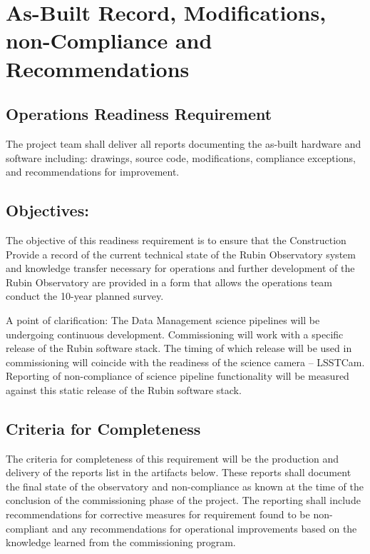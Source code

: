 \section{As-Built Record, Modifications, non-Compliance and Recommendations} \label{sec:recs}

\subsection{Operations Readiness Requirement}
The project team shall deliver all reports documenting the as-built hardware and software including: drawings, source code, modifications, compliance exceptions, and recommendations for improvement.

\subsection{Objectives:}

The objective of this readiness requirement is to ensure that the Construction Provide a record of the current technical state of the Rubin Observatory system and knowledge transfer necessary for operations and further development of the Rubin Observatory are provided in a form that allows the operations team conduct the 10-year planned survey.

A point of clarification: The Data Management science pipelines will be undergoing continuous development.  Commissioning will work with a specific release of the Rubin software stack.  The timing of which release will be used in commissioning will coincide with the readiness of the science camera -- LSSTCam.  Reporting of non-compliance of science pipeline functionality will be measured against this static release of the Rubin software stack.

\subsection{Criteria for Completeness}

The criteria for completeness of this requirement will be the production and delivery of the reports list in the artifacts below.  These reports shall document the final state of the observatory and non-compliance as known at the time of the conclusion of the commissioning phase of the project.  The reporting shall include recommendations for corrective measures for requirement found to be non-compliant and any recommendations for operational improvements based on the knowledge learned from the commissioning program.

